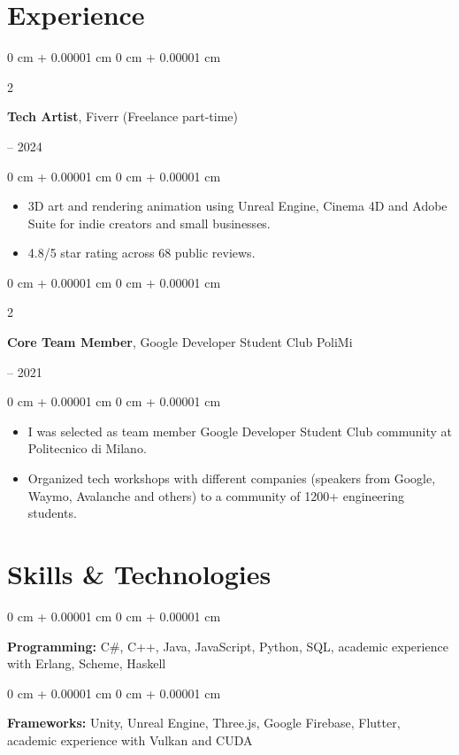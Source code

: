 \documentclass[11pt, letterpaper]{article}
\newenvironment{highlights}{
    \begin{itemize}[
        topsep=0.10 cm,
        parsep=0.10 cm,
        partopsep=0pt,
        itemsep=0pt,
        leftmargin=0 cm + 10pt
    ]
}{
    \end{itemize}
} %
\newenvironment{onecolentry}{
    \begin{adjustwidth}{
        0 cm + 0.00001 cm
    }{
        0 cm + 0.00001 cm
    }
}{
    \end{adjustwidth}
} %
\newenvironment{twocolentry}[2][]{
    \onecolentry
    \def\secondColumn{#2}
    \setcolumnwidth{\fill, 4.5 cm}
    \begin{paracol}{2}
}{
    \switchcolumn \raggedleft \secondColumn
    \end{paracol}
    \endonecolentry
} %
\begin{document}
    \section{Experience}

    \begin{twocolentry}{
        2018 – 2024
    }
        \textbf{Tech Artist}, Fiverr (Freelance part-time)
    \end{twocolentry}

    \vspace{0.10 cm}
    \begin{onecolentry}
        \begin{highlights}
            \item 3D art and rendering animation using Unreal Engine, Cinema 4D and Adobe Suite for indie creators and small businesses.
            \item 4.8/5 star rating across 68 public reviews.
        \end{highlights}
    \end{onecolentry}

    \vspace{0.2 cm}

    \begin{twocolentry}{
        2020 – 2021
    }
        \textbf{Core Team Member}, Google Developer Student Club PoliMi
    \end{twocolentry}

    \vspace{0.10 cm}
    \begin{onecolentry}
        \begin{highlights}
            \item  I was selected as team member Google Developer Student Club community at Politecnico di Milano. 
            \item Organized tech workshops with different companies (speakers from Google, Waymo, Avalanche and others) to a community of 1200+ engineering students.
        \end{highlights}
    \end{onecolentry}

  
    \section{Skills \& Technologies}

    \begin{onecolentry}
        \textbf{Programming:} C\#, C++, Java, JavaScript,  Python, SQL, academic experience with Erlang, Scheme, Haskell
    \end{onecolentry}

    \vspace{0.1 cm}

    \begin{onecolentry}
        \textbf{Frameworks:} Unity, Unreal Engine, Three.js, Google Firebase, Flutter, academic experience with Vulkan and CUDA
    \end{onecolentry}
\end{document}
